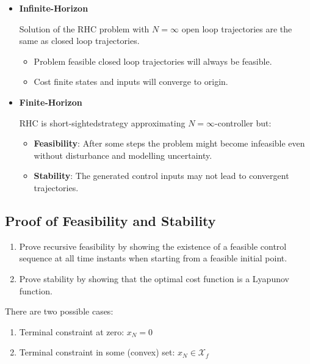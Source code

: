\documentclass[8pt,a4paper]{scrartcl}
\begin{document}
\begin{multicols*}{3}
\begin{multicols*}{4}
\begin{itemize}
\item \textbf{Infinite-Horizon}

Solution of the RHC problem with $N=\infty$ \dahe open loop trajectories are the same as closed loop trajectories.
\begin{itemize}

\item Problem feasible \dahe closed loop trajectories will always be feasible.
\item Cost finite \dahe states and inputs will converge to origin.
\end{itemize}
\item \textbf{Finite-Horizon}

RHC is \glqq short-sighted\grqq strategy approximating $N=\infty$-controller but:
\begin{itemize}

\item \textbf{Feasibility}: After some steps the problem might become infeasible even without disturbance and modelling uncertainty.
\item \textbf{Stability}: The generated control inputs may not lead to convergent trajectories.
\end{itemize}
\end{itemize}

\subsection{Proof of Feasibility and Stability}

\begin{enumerate}

\item Prove recursive feasibility by showing the existence of a feasible control sequence at all time instants when starting from a feasible initial point.
\item Prove stability by showing that the optimal cost function is a Lyapunov function.
\end{enumerate}

There are two possible cases:
\begin{enumerate}

\item Terminal constraint at zero: $x_N=0$
\item Terminal constraint in some (convex) set: $x_N\in\mathcal{X}_f$
\end{enumerate}

\end{multicols*}
\end{multicols*}
\end{document}
